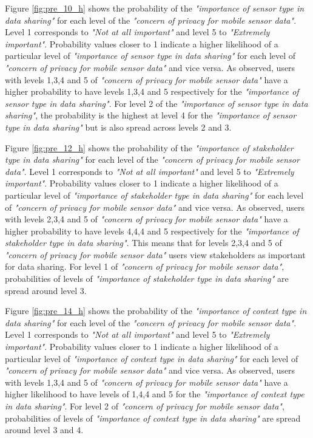 Figure \ref{fig:pre_10_h} shows the probability of the \textit{"importance of sensor type in data sharing"} for each level of the \textit{"concern of privacy for mobile sensor data"}. Level 1 corresponds to \textit{"Not at all important"} and level 5 to \textit{"Extremely important"}. Probability values closer to 1 indicate a higher likelihood of a particular level of \textit{"importance of sensor type in data sharing"} for each level of \textit{"concern of privacy for mobile sensor data"} and vice versa. As observed, users with levels 1,3,4 and 5 of \textit{"concern of privacy for mobile sensor data"} have a higher probability to have levels 1,3,4 and 5 respectively for the \textit{"importance of sensor type in data sharing"}. For level 2 of the \textit{"importance of sensor type in data sharing"}, the probability is the highest at level 4 for the \textit{"importance of sensor type in data sharing"} but is also spread across levels 2 and 3.

Figure \ref{fig:pre_12_h} shows the probability of the \textit{"importance of stakeholder type in data sharing"} for each level of the \textit{"concern of privacy for mobile sensor data"}. Level 1 corresponds to \textit{"Not at all important"} and level 5 to \textit{"Extremely important"}. Probability values closer to 1 indicate a higher likelihood of a particular level of \textit{"importance of stakeholder type in data sharing"} for each level of \textit{"concern of privacy for mobile sensor data"} and vice versa. As observed, users with levels 2,3,4 and 5 of \textit{"concern of privacy for mobile sensor data"} have a higher probability to have levels 4,4,4 and 5 respectively for the \textit{"importance of stakeholder type in data sharing"}. This means that for levels 2,3,4 and 5 of \textit{"concern of privacy for mobile sensor data"} users view stakeholders as important for data sharing. For level 1 of \textit{"concern of privacy for mobile sensor data"}, probabilities of levels of \textit{"importance of stakeholder type in data sharing"} are spread around level 3.

Figure \ref{fig:pre_14_h} shows the probability of the \textit{"importance of context type in data sharing"} for each level of the \textit{"concern of privacy for mobile sensor data"}. Level 1 corresponds to \textit{"Not at all important"} and level 5 to \textit{"Extremely important"}. Probability values closer to 1 indicate a higher likelihood of a particular level of \textit{"importance of context type in data sharing"} for each level of \textit{"concern of privacy for mobile sensor data"} and vice versa. As observed, users with levels 1,3,4 and 5 of \textit{"concern of privacy for mobile sensor data"} have a higher likelihood to have levels of 1,4,4 and 5 for the \textit{"importance of context type in data sharing"}. For level 2 of \textit{"concern of privacy for mobile sensor data"}, probabilities of levels of \textit{"importance of context type in data sharing"} are spread around level 3 and 4. 

